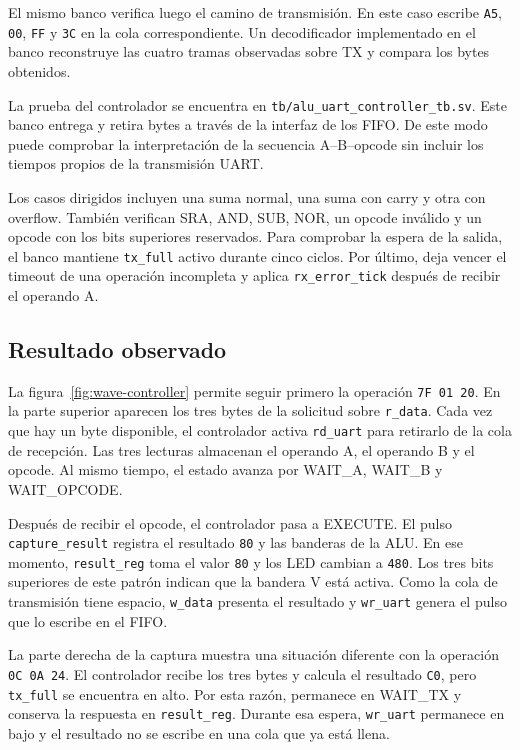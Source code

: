 El mismo banco verifica luego el camino de transmisión. En este caso
escribe \texttt{A5}, \texttt{00}, \texttt{FF} y \texttt{3C} en la
cola correspondiente. Un decodificador implementado en el banco
reconstruye las cuatro tramas observadas sobre TX y compara los bytes obtenidos.

La prueba del controlador se encuentra en
\texttt{tb/alu\allowbreak\_uart\allowbreak\_controller\allowbreak\_tb.sv}.
Este banco entrega y retira bytes a través de la interfaz de los
FIFO. De este modo puede comprobar la interpretación de la secuencia
A--B--opcode sin incluir los tiempos propios de la transmisión UART.

Los casos dirigidos incluyen una suma normal, una suma con carry y
otra con overflow. También verifican SRA, AND, SUB, NOR, un opcode
inválido y un opcode con los bits superiores reservados. Para
comprobar la espera de la salida, el banco mantiene \texttt{tx\_full}
activo durante cinco ciclos. Por último, deja vencer el timeout de
una operación incompleta y aplica \texttt{rx\_error\_tick} después de
recibir el operando A.

\subsection{Resultado observado}

La figura~\ref{fig:wave-controller} permite seguir primero la
operación \texttt{7F 01 20}. En la parte superior aparecen los tres
bytes de la solicitud sobre \texttt{r\_data}. Cada vez que hay un
byte disponible, el controlador activa \texttt{rd\_uart} para
retirarlo de la cola de recepción. Las tres lecturas almacenan el
operando A, el operando B y el opcode. Al mismo tiempo, el estado
avanza por WAIT\_A, WAIT\_B y WAIT\_OPCODE.

Después de recibir el opcode, el controlador pasa a EXECUTE. El pulso
\texttt{capture\_result} registra el resultado \texttt{80} y las
banderas de la ALU. En ese momento, \texttt{result\_reg} toma el
valor \texttt{80} y los LED cambian a \texttt{480}. Los tres bits
superiores de este patrón indican que la bandera V está activa. Como
la cola de transmisión tiene espacio, \texttt{w\_data} presenta el
resultado y \texttt{wr\_uart} genera el pulso que lo escribe en el FIFO.

La parte derecha de la captura muestra una situación diferente con la
operación \texttt{0C 0A 24}. El controlador recibe los tres bytes y
calcula el resultado \texttt{C0}, pero \texttt{tx\_full} se encuentra
en alto. Por esta razón, permanece en WAIT\_TX y conserva la
respuesta en \texttt{result\_reg}. Durante esa espera,
\texttt{wr\_uart} permanece en bajo y el resultado no se escribe en
una cola que ya está llena.

